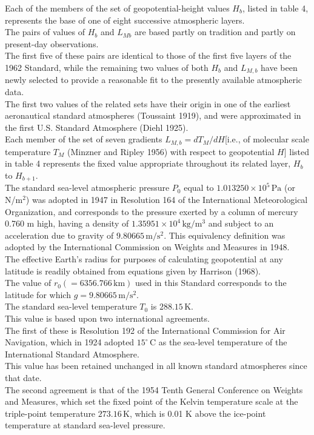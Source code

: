 \documentclass{article}
\begin{document}
Each of the members of the set of geopotential-height values $H_b$, listed in table 4, represents the base of one of eight successive atmospheric layers.\\
The pairs of values of $H_b$ and $L_{Mb}$ are based partly on tradition and partly on present-day observations.\\
The first five of these pairs are identical to those of the first five layers of the 1962 Standard, while the remaining two values of both $H_b$ and $L_{M,b}$ have been newly selected to provide a reasonable fit to the presently available atmospheric data.\\
The first two values of the related sets have their origin in one of the earliest aeronautical standard atmospheres (Toussaint 1919), and were approximated in the first U.S. Standard Atmosphere (Diehl 1925).\\

Each member of the set of seven gradients $L_{M,b} = dT_M/dH$[i.e., of molecular scale temperature $T_M$ (Minzner and Ripley 1956) with respect to geopotential $H$] listed in table 4 represents the fixed value appropriate throughout its related layer, $H_b$ to $H_{b+1}$.\\

The standard sea-level atmospheric pressure $P_0$ equal to $1.013250 \times 10^{5} \, \mathrm{Pa}$ (or N/m$^2$) was adopted in 1947 in Resolution 164 of the International Meteorological Organization, and corresponds to the pressure exerted by a column of mercury 0.760 m high, having a density of $1.35951 \times 10^{4} \, \mathrm{kg/m^3}$ and subject to an acceleration due to gravity of $9.80665 \, \mathrm{m/s^2}$.
This equivalency definition was adopted by the International Commission on Weights and Measures in 1948.\\

The effective Earth's radius for purposes of calculating geopotential at any latitude is readily obtained from equations given by Harrison (1968).\\

The value of $r_0 (= 6356.766 \, \mathrm{km})$ used in this Standard corresponds to the latitude for which $g = 9.80665 \, \mathrm{m/s^2}$.\\

The standard sea-level temperature $T_0$ is $288.15 \, \mathrm{K}$.\\
This value is based upon two international agreements.\\
The first of these is Resolution 192 of the International Commission for Air Navigation, which in 1924 adopted $15^\circ \, \mathrm{C}$ as the sea-level temperature of the International Standard Atmosphere.\\
This value has been retained unchanged in all known standard atmospheres since that date.\\
The second agreement is that of the 1954 Tenth General Conference on Weights and Measures, which set the fixed point of the Kelvin temperature scale at the triple-point temperature $273.16 \, \mathrm{K}$, which is 0.01 K above the ice-point temperature at standard sea-level pressure.\\
\end{document}
